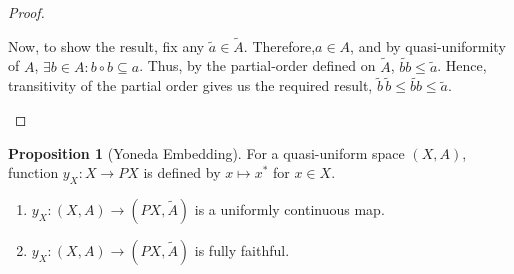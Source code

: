 \documentclass[a4paper]{article}
\theoremstyle{definition}
\newtheorem{prop}[theorem]{Proposition}
\begin{document}
\begin{proof}
\begin{enumerate}[label=(\roman*)]
			Now, to show the result, fix any $\tilde{a}\in \tilde{A}$. Therefore,$a\in A$, and
			by quasi-uniformity of $A$, $\exists b \in A: b \circ b \subseteq
			a$. Thus, by the partial-order defined on $\tilde{A}$, $\widetilde{bb} \leq \tilde{a}$.
			Hence, transitivity of the partial order gives us the required result,
			$ \tilde{b} \, \tilde{b} \leq \widetilde{bb} \leq \tilde{a}$. \qedhere
	\end{enumerate}
\end{proof}
\begin{prop}[Yoneda Embedding]
\item For a quasi-uniform space $(X,A)$, function $y_X:X \to PX$ is defined by $x\mapsto x^*$ for $x \in X$.
	\begin{enumerate}[label=(\alph*)]
		\item $y_X:(X,A) \rightarrow (PX,\tilde{A})$ is a uniformly continuous map.
		\item $y_X:(X,A) \rightarrow (PX,\tilde{A})$ is fully faithful.
	\end{enumerate}
\end{prop}
\end{document}
